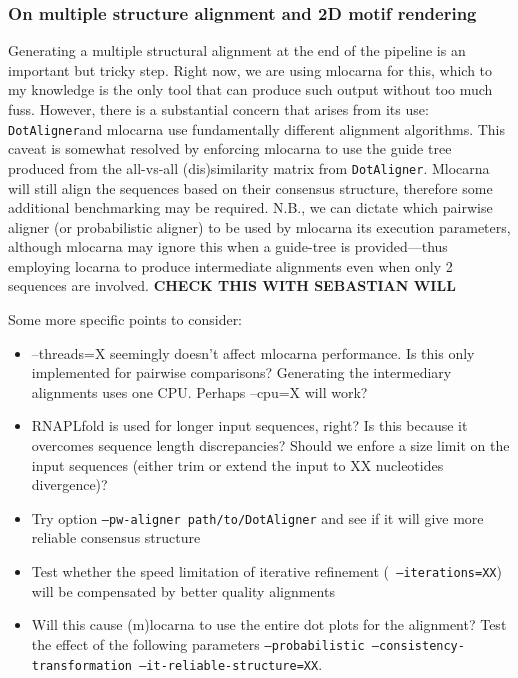 \documentclass[a4paper,twoside]{article}
\newcommand\dotaligner{\texttt{DotAligner}}
\begin{document}
\subsubsection{ On multiple structure alignment and 2D motif rendering }

Generating a multiple structural alignment at the end of the pipeline is an
important but tricky step.  Right now, we are using mlocarna for this, which to
my knowledge is the only tool that can produce such output without too much
fuss. However, there is a substantial concern that arises from its use:
\dotaligner and mlocarna use fundamentally different alignment algorithms. This
caveat is somewhat resolved by enforcing mlocarna to use the guide tree
produced from the all-vs-all (dis)similarity matrix from \dotaligner . Mlocarna
will still align the sequences based on their consensus structure, therefore
some additional benchmarking may be required. N.B., we can dictate which
pairwise aligner (or probabilistic aligner) to be used by mlocarna its
execution parameters, although mlocarna may ignore this when a guide-tree is
provided---thus employing locarna to produce intermediate alignments even when
only 2 sequences are involved. \textbf{CHECK THIS WITH SEBASTIAN WILL }

Some more specific points to consider: 
\begin{itemize}
\item --threads=X seemingly doesn't affect mlocarna performance. Is this only implemented for pairwise comparisons? 
Generating the intermediary alignments uses one CPU. Perhaps --cpu=X will work? 
\item RNAPLfold is used for longer input sequences, right? Is this because it overcomes sequence length discrepancies? 
Should we enfore a size limit on the input sequences (either trim or extend the input to XX nucleotides divergence)?
\item Try option \texttt{--pw-aligner path/to/DotAligner} and see if it will give more reliable consensus structure
\item Test whether the speed limitation of iterative refinement (\texttt{ --iterations=XX}) will be compensated by 
better quality alignments
\item Will this cause (m)locarna to use the entire dot plots for the alignment? Test the effect of the following 
parameters \texttt{--probabilistic --consistency-transformation --it-reliable-structure=XX}. 
\end{itemize} 
\end{document}
